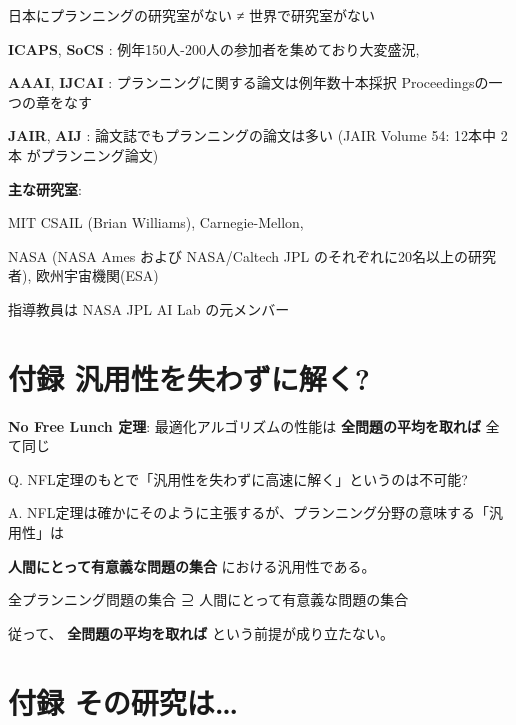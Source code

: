 日本にプランニングの研究室がない ≠ 世界で研究室がない

\textbf{ICAPS}, \textbf{SoCS} : 例年150人-200人の参加者を集めており大変盛況, 

\textbf{AAAI}, \textbf{IJCAI} : プランニングに関する論文は例年数十本採択 Proceedingsの一つの章をなす

\textbf{JAIR}, \textbf{AIJ} : 論文誌でもプランニングの論文は多い (JAIR Volume 54: 12本中 2本 がプランニング論文)

\textbf{主な研究室}:

MIT CSAIL (Brian Williams), Carnegie-Mellon, 

NASA (NASA Ames および NASA/Caltech JPL のそれぞれに20名以上の研究者), 欧州宇宙機関(ESA)

指導教員は NASA JPL AI Lab の元メンバー

\section{付録 汎用性を失わずに解く?}
\label{sec-20}

\textbf{No Free Lunch 定理}: 最適化アルゴリズムの性能は \textbf{全問題の平均を取れば} 全て同じ

Q. NFL定理のもとで「汎用性を失わずに高速に解く」というのは不可能?

A. NFL定理は確かにそのように主張するが、プランニング分野の意味する「汎用性」は

\textbf{人間にとって有意義な問題の集合} における汎用性である。

\begin{center}
全プランニング問題の集合 ⊇ 人間にとって有意義な問題の集合
\end{center}

従って、 \textbf{全問題の平均を取れば} という前提が成り立たない。

\section{付録 その研究は\ldots{}}
\label{sec-21}




